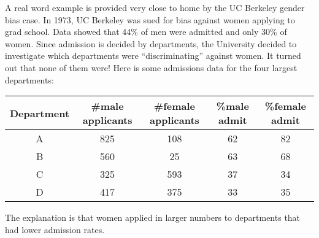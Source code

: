 \documentclass[11pt,fleqn]{article}
\begin{document}
A real word example is provided very close to home by the UC Berkeley 
gender bias case. In 1973, UC Berkeley was sued for bias against women 
applying to grad school.  Data showed that 44\% of men were admitted 
and only 30\% of women. Since admission is decided by departments,
the University decided to investigate which departments were ``discriminating''
against women.  It turned out that none of them were! Here is some
admissions data for the four largest departments:
\begin{center}
\begin{tabular}{|c|c|c|c|c|}
  \hline
  Department & \#male applicants & \#female applicants & \%male admit & \%female admit \\\hline
  A & 825 & 108 & 62 & 82 \\
  B & 560 & 25  & 63 & 68 \\
  C & 325 & 593 & 37 & 34 \\
  D & 417 & 375 & 33 & 35 \\
  \hline
\end{tabular}
\end{center}

The explanation is that women applied in larger numbers to departments 
that had lower admission rates.
\end{document}
